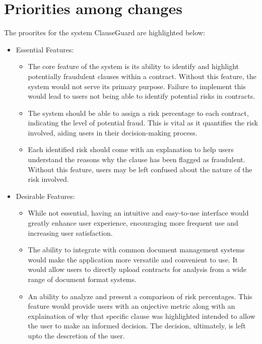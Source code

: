 \section{Priorities among changes \label{Section::Priorities among changes}}
The proorites for the system ClauseGuard are highlighted below: 
\begin{itemize}
    \item Essential Features: \begin{itemize}
        \item The core feature of the system is its ability to identify and highlight potentially fraudulent clauses within a contract. Without this feature, the system would not serve its primary purpose. Failure to implement this would lead to users not being able to identify potential risks in contracts.
        \item The system should be able to assign a risk percentage to each contract, indicating the level of potential fraud. This is vital as it quantifies the risk involved, aiding users in their decision-making process.


        \item Each identified risk should come with an explanation to help users understand the reasons why the clause has been flagged as fraudulent. Without this feature, users may be left confused about the nature of the risk involved.


       
        




    \end{itemize} 

    \item Desirable Features: 
    \begin{itemize}
        \item While not essential, having an intuitive and easy-to-use interface would greatly enhance user experience, encouraging more frequent use and increasing user satisfaction.

        \item The ability to integrate with common document management systems would make the application more versatile and convenient to use. It would allow users to directly upload contracts for analysis from a wide range of document format systems.

        \item  An ability to analyze and present a comparison of risk percentages. This feature would provide users with an onjective metric along with an explaination of why that specific clause was highlighted intended to allow the user to make an informed decision. The decision, ultimately, is left upto the descretion of the user. 


\end{itemize}
\end{itemize}
